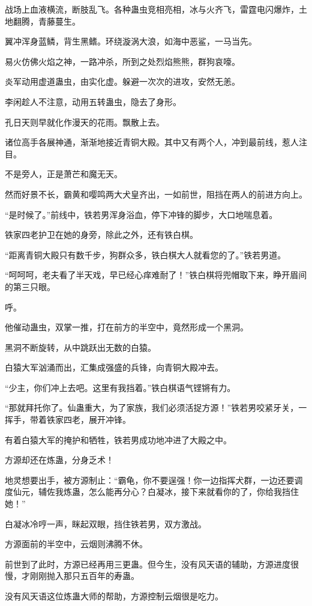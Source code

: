 \begin{this_body}
战场上血液横流，断肢乱飞。各种蛊虫竞相亮相，冰与火齐飞，雷霆电闪爆炸，土地翻腾，青藤蔓生。

翼冲浑身蓝鳞，背生黑鳍。环绕漩涡大浪，如海中恶鲨，一马当先。

易火仿佛火焰之神，一路冲杀，所到之处烈焰熊熊，群狗哀嚎。

炎军动用虚道蛊虫，由实化虚。躲避一次次的进攻，安然无恙。

李闲趁人不注意，动用五转蛊虫，隐去了身形。

孔日天则早就化作漫天的花雨。飘散上去。

诸位高手各展神通，渐渐地接近青铜大殿。其中又有两个人，冲到最前线，惹人注目。

不是旁人，正是萧芒和魔无天。

然而好景不长，霸黄和嘤鸣两大犬皇齐出，一如前世，阻挡在两人的前进方向上。

“是时候了。”前线中，铁若男浑身浴血，停下冲锋的脚步，大口地喘息着。

铁家四老护卫在她的身旁，除此之外，还有铁白棋。

“距离青铜大殿只有数千步，狗群众多，铁白棋大人就看您的了。”铁若男道。

“呵呵呵，老夫看了半天戏，早已经心痒难耐了！”铁白棋将兜帽取下来，睁开眉间的第三只眼。

呼。

他催动蛊虫，双掌一推，打在前方的半空中，竟然形成一个黑洞。

黑洞不断旋转，从中跳跃出无数的白猿。

白猿大军汹涌而出，汇集成强盛的兵锋，向青铜大殿冲去。

“少主，你们冲上去吧。这里有我挡着。”铁白棋语气铿锵有力。

“那就拜托你了。仙蛊重大，为了家族，我们必须活捉方源！”铁若男咬紧牙关，一挥手，带着铁家四老，展开冲锋。

有着白猿大军的掩护和牺牲，铁若男成功地冲进了大殿之中。

方源却还在炼蛊，分身乏术！

地灵想要出手，被方源制止：“霸龟，你不要逞强！你一边指挥犬群，一边还要调度仙元，辅佐我炼蛊，怎么能再分心？白凝冰，接下来就看你的了，你给我挡住她！”

白凝冰冷哼一声，眯起双眼，挡住铁若男，双方激战。

方源面前的半空中，云烟则沸腾不休。

前世到了此时，方源已经再用三更蛊。但今生，没有风天语的辅助，方源进度很慢，才刚刚抛入那只五百年的寿蛊。

没有风天语这位炼蛊大师的帮助，方源控制云烟很是吃力。


\end{this_body}
